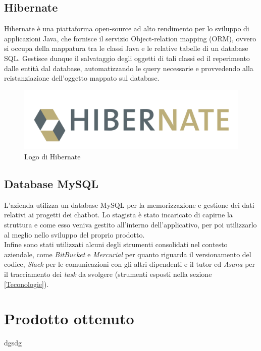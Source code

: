 \subsection{Hibernate}
Hibernate è una piattaforma open-source ad alto rendimento per lo sviluppo di applicazioni Java, che fornisce il servizio Object-relation mapping (ORM), ovvero si occupa della mappatura tra le classi Java e le relative tabelle di un database SQL.
Gestisce dunque il salvataggio degli oggetti di tali classi ed il reperimento dalle entità dal database, automatizzando le query necessarie e provvedendo alla reistanziazione dell’oggetto mappato sul database.
\begin{figure}[h]
	\centering
	\includegraphics[scale=0.35]{../Immagini/Hibernate.png}
	\caption{Logo di Hibernate}
\end{figure}

\subsection{Database MySQL} 
L'azienda \azienda{} utilizza un database MySQL per la memorizzazione e gestione dei dati relativi ai progetti dei \gls{chatbot}.
Lo stagista è stato incaricato di capirne la struttura e come esso veniva gestito all'interno dell'applicativo, per poi utilizzarlo al meglio nello sviluppo del proprio prodotto.\\



Infine sono stati utilizzati alcuni degli strumenti consolidati nel contesto aziendale, come \emph{BitBucket} e \emph{Mercurial} per quanto riguarda il versionamento del codice, \emph{Slack} per le comunicazioni con gli altri dipendenti e il tutor ed \emph{Asana} per il tracciamento dei \emph{task} da svolgere (strumenti esposti nella sezione \ref{Teconologie}).




\section{Prodotto ottenuto}

dgsdg
